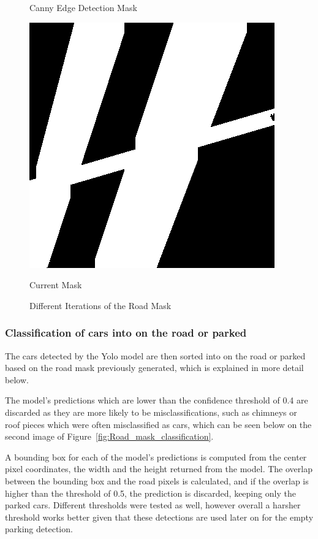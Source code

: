 \begin{figure}[htbp]
\begin{minipage}{0.45\textwidth}
        \caption*{Canny Edge Detection Mask}
    \end{minipage}
    \hfill
    \begin{minipage}{0.45\textwidth}
        \centering
        \includegraphics[width=\textwidth]{images/current_mask.png}
        \caption*{Current Mask}
    \end{minipage}
    \caption{Different Iterations of the Road Mask}
    \label{fig:Mask_Iterations}
\end{figure}

\newpage

\subsubsection{Classification of cars into on the road or parked}
The cars detected by the Yolo model are then sorted into on the road or parked based on the road mask previously generated, which is explained in more detail below.

The model's predictions which are lower than the confidence threshold of 0.4 are discarded as they are more likely to be misclassifications, such as chimneys or roof pieces which were often misclassified as cars, which can be seen below on the second image of Figure~\ref{fig:Road_mask_classification}.

A bounding box for each of the model's predictions is computed from the center pixel coordinates, the width and the height returned from the model.
The overlap between the bounding box and the road pixels is calculated, and if the overlap is higher than the threshold of 0.5, the prediction is discarded, keeping only the parked cars.
Different thresholds were tested as well, however overall a harsher threshold works better given that these detections are used later on for the empty parking detection.

